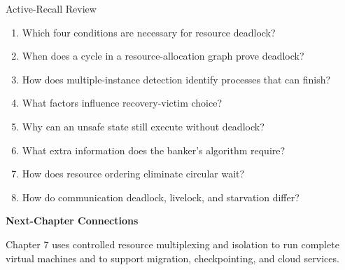 \documentclass[10pt,letterpaper]{article}
\begin{document}
\enlargethispage{2\baselineskip}
\begin{studybox}{Active-Recall Review}
\small
\begin{enumerate}
  \item Which four conditions are necessary for resource deadlock?
  \item When does a cycle in a resource-allocation graph prove deadlock?
  \item How does multiple-instance detection identify processes that can finish?
  \item What factors influence recovery-victim choice?
  \item Why can an unsafe state still execute without deadlock?
  \item What extra information does the banker's algorithm require?
  \item How does resource ordering eliminate circular wait?
  \item How do communication deadlock, livelock, and starvation differ?
\end{enumerate}
\end{studybox}

\par\medskip
{\color{navy}\bfseries Next-Chapter Connections}\par\smallskip
Chapter 7 uses controlled resource multiplexing and isolation to run complete virtual machines and to support migration, checkpointing, and cloud services.
\normalsize
\end{document}

